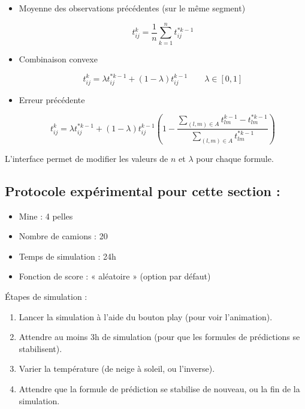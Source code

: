 \documentclass[letterpaper,12pt]{article}
\begin{document}
	
	\begin{itemize}
		
		\item Moyenne des observations précédentes (sur le même segment)
		
		\begin{equation}
		t_{ij}^k = \frac{1}{n} \sum\limits_{k=1}^n t_{ij}^{*k-1}
		\end{equation}
		
		\item Combinaison convexe
		
		\begin{equation}
		t_{ij}^k = \lambda t^{*k-1}_{ij} + (1-\lambda) t_{ij}^{k-1} \qquad \lambda \in [0, 1]
		\end{equation}
		
		\item Erreur précédente
		
		\begin{equation}
		t_{ij}^k = \lambda t^{*k-1}_{ij} + (1-\lambda) t_{ij}^{k-1} \left( 1- \frac{\sum\limits_{(l,m) \in A} t_{lm}^{k-1} - t_{lm}^{*k-1}}{\sum\limits_{(l,m) \in A} t_{lm}^{*k-1}}\right)
		\end{equation}
		
		
	\end{itemize}
	
	L'interface permet de modifier les valeurs de $n$ et $\lambda$ pour chaque formule.
	
	\subsection*{Protocole expérimental pour cette section : }
	
	\begin{itemize}
		\item Mine : 4 pelles
		\item Nombre de camions : 20
		\item Temps de simulation : 24h
		\item Fonction de score : « aléatoire » (option par défaut)
	\end{itemize}
	
	Étapes de simulation : 
	\begin{enumerate}
		\item Lancer la simulation à l’aide du bouton play (pour voir l’animation).
		\item Attendre au moins 3h de simulation (pour que les formules de prédictions se stabilisent).
		\item Varier la température (de neige à soleil, ou l’inverse).
		\item Attendre que la formule de prédiction se stabilise de nouveau, ou la fin de la simulation.
	\end{enumerate}
	
\end{document}

